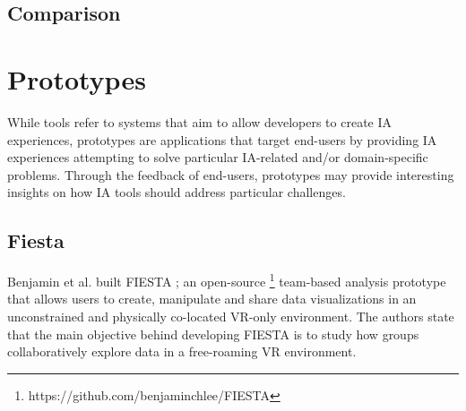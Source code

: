 \documentclass{vgtc}                          %
\begin{document}
\subsection{Comparison}

\section{Prototypes}

While tools refer to systems that aim to allow developers to create IA
experiences, prototypes are applications that target end-users by providing IA
experiences attempting to solve particular IA-related and/or domain-specific
problems. Through the feedback of end-users, prototypes may provide interesting
insights on how IA tools should address particular challenges.


\subsection{Fiesta}

\noindent Benjamin et al. built FIESTA \cite{fiesta_prototype}; an open-source
\footnote{https://github.com/benjaminchlee/FIESTA} team-based analysis
prototype that allows users to create, manipulate and share data visualizations
in an unconstrained and physically co-located VR-only environment. The authors
state that the main objective behind developing FIESTA is to study how groups
collaboratively explore data in a free-roaming VR environment.

\medskip
\end{document}
